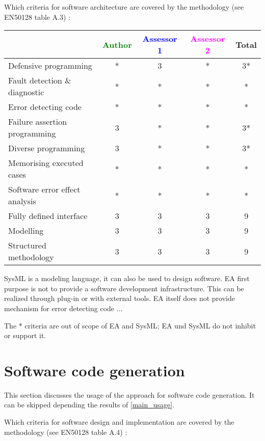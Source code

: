 Which criteria for software architecture are covered by the methodology
(see EN50128 table A.3) :

\begin{tabular}{|l | c | c | c | c|}
\hline
& \textcolor{green}{Author} & \textcolor{blue}{Assessor 1} & \textcolor{magenta}{Assessor 2} & Total \\
\hline
Defensive programming  &* & 3 & *& 3* \\
\hline 
Fault detection \& diagnostic  &* & *& *& * \\
\hline
Error detecting code  &* & *& *& * \\
\hline
Failure assertion programming &3 & *& *& 3* \\
\hline
Diverse programming &3 & *& *&  3* \\
\hline
Memorising executed cases &* & *&* & * \\
\hline
Software error effect analysis &* & *&* & * \\
\hline
Fully defined interface &3 & 3 & 3& 9 \\
\hline
Modelling  &3 & 3& 3& 9 \\
\hline
Structured methodology &3 & 3& 3& 9 \\
\hline
\end{tabular}
\begin{author_comment}
SysML is a modeling language, it can also be used to design
software. EA first purpose is not to provide a software development
infrastructure. This can be realized through plug-in or with external
tools.
EA itself does not provide mechanism for error detecting code ...
\end{author_comment}

\begin{assessor1}
The * criteria are out of scope of EA and SysML; EA und SysML do not inhibit or support it.
\end{assessor1}

\section{Software code generation}
This section discusses the usage of the approach for software code generation.
It can be skipped depending the results of \ref{main_usage}.

Which criteria for software design and implementation are covered by the methodology
(see EN50128 table A.4) :

